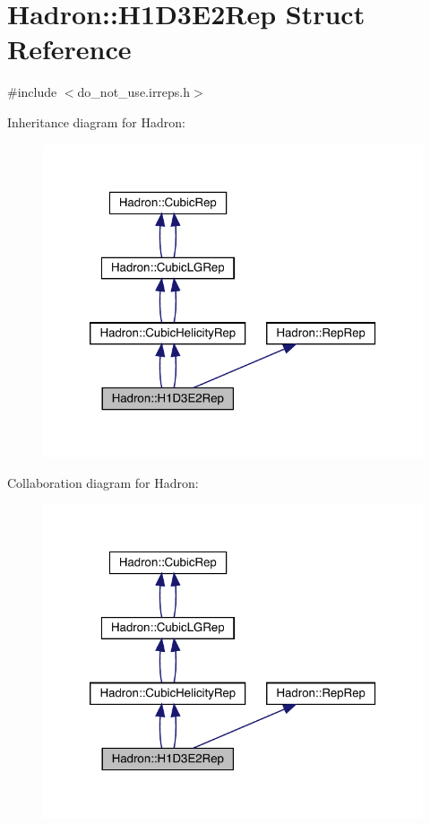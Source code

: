 \hypertarget{structHadron_1_1H1D3E2Rep}{}\section{Hadron\+:\+:H1\+D3\+E2\+Rep Struct Reference}
\label{structHadron_1_1H1D3E2Rep}


{\ttfamily \#include $<$do\+\_\+not\+\_\+use.\+irreps.\+h$>$}



Inheritance diagram for Hadron\+:\nopagebreak
\begin{figure}[H]
\begin{center}
\leavevmode
\includegraphics[width=320pt]{d2/da1/structHadron_1_1H1D3E2Rep__inherit__graph}
\end{center}
\end{figure}


Collaboration diagram for Hadron\+:\nopagebreak
\begin{figure}[H]
\begin{center}
\leavevmode
\includegraphics[width=320pt]{d2/d4c/structHadron_1_1H1D3E2Rep__coll__graph}
\end{center}
\end{figure}
